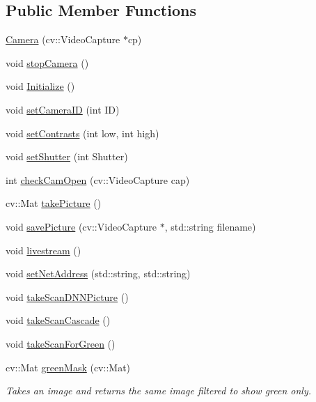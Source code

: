 \subsection*{Public Member Functions}
\begin{DoxyCompactItemize}
\item 
\hyperlink{classCamera_a8facf3634f5d9d5be12c488eac7b7e2a}{Camera} (cv\+::\+Video\+Capture $\ast$cp)
\item 
void \hyperlink{classCamera_aac0e2e17954d17a0c15019ca74149f15}{stop\+Camera} ()
\item 
void \hyperlink{classCamera_afd88c2780203f02c9fe236a7239e414c}{Initialize} ()
\item 
void \hyperlink{classCamera_af699a1dad54f8631e862b6f7703e48d3}{set\+Camera\+ID} (int ID)
\item 
void \hyperlink{classCamera_aef0a4ebb556d5a2a0f13e5d120c05259}{set\+Contrasts} (int low, int high)
\item 
void \hyperlink{classCamera_a9409482c4422823f73d45b3d5e29304b}{set\+Shutter} (int Shutter)
\item 
int \hyperlink{classCamera_a230bee20d42ae409aba0700d8205bbe0}{check\+Cam\+Open} (cv\+::\+Video\+Capture cap)
\item 
cv\+::\+Mat \hyperlink{classCamera_a07670e99337fb322375a412222c06ada}{take\+Picture} ()
\item 
void \hyperlink{classCamera_a919fb6f236e4535c0d2d29d760562ba5}{save\+Picture} (cv\+::\+Video\+Capture $\ast$, std\+::string filename)
\item 
void \hyperlink{classCamera_af0d3c970e947813e71f316b9e499b456}{livestream} ()
\item 
void \hyperlink{classCamera_a3595618ceff1b74e79633b4132ada11f}{set\+Net\+Address} (std\+::string, std\+::string)
\item 
void \hyperlink{classCamera_a59f08842d3de300419c74b12bee44d47}{take\+Scan\+D\+N\+N\+Picture} ()
\item 
void \hyperlink{classCamera_a09931f84cc8e66e4e4c1181cb1cb4af6}{take\+Scan\+Cascade} ()
\item 
void \hyperlink{classCamera_ab4f4c3f77479c8594dfa7fd7e6348306}{take\+Scan\+For\+Green} ()
\item 
cv\+::\+Mat \hyperlink{classCamera_adf305e574ca94bce9435c217fef1501b}{green\+Mask} (cv\+::\+Mat)
\begin{DoxyCompactList}\small\item\em Takes an image and returns the same image filtered to show green only. \end{DoxyCompactList}\item 

\end{DoxyCompactItemize}

